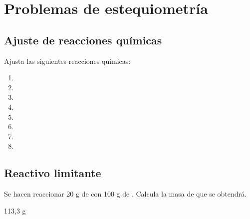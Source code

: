 \documentclass[
]{article}
\author{}
\date{}
\begin{document}
\hypertarget{problemas-de-estequiometruxeda}{%
\section{Problemas de
estequiometría}\label{problemas-de-estequiometruxeda}}

\hypertarget{ajuste-de-reacciones-quuxedmicas}{%
\subsection{Ajuste de reacciones
químicas}\label{ajuste-de-reacciones-quuxedmicas}}

\begin{exercise}Ajusta las siguientes reacciones químicas:

\begin{enumerate}
\def\labelenumi{\alph{enumi})}
\item
\item
\item
\item
\item
\item
\item
\item
\end{enumerate}

\end{exercise}

\hypertarget{reactivo-limitante}{%
\subsection{Reactivo limitante}\label{reactivo-limitante}}

\begin{exercise}[tags=OXF15] Se hacen reaccionar 20 g de  con 100
g de . Calcula la masa de  que se obtendrá.\end{exercise}

\begin{solution}113,3 g\end{solution}
\end{document}
